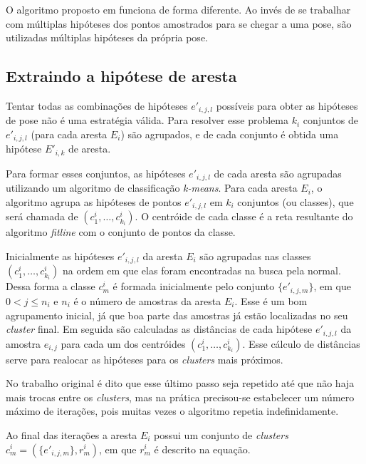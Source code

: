 O algoritmo proposto em \cite{celine} funciona de forma diferente. Ao invés de se trabalhar com múltiplas hipóteses dos pontos amostrados para se chegar a uma pose, são utilizadas múltiplas hipóteses da própria pose.

\subsection{Extraindo a hipótese de aresta}

Tentar todas as combinações de hipóteses $e'_{i,j,l}$ possíveis para obter as hipóteses de pose não é uma estratégia válida. Para resolver esse problema $k_i$ conjuntos de $e'_{i,j,l}$ (para cada aresta $E_i$) são agrupados, e de cada conjunto é obtida uma hipótese $E'_{i,k}$ de aresta.

Para formar esses conjuntos, as hipóteses $e'_{i,j,l}$ de cada aresta são agrupadas utilizando um algoritmo de classificação \emph{k-means}. Para cada aresta $E_i$, o algoritmo agrupa as hipóteses de pontos $e'_{i,j,l}$ em $k_i$ conjuntos (ou classes), que será chamada de $(c^i_1, \dots, c^i_{k_i})$. O centróide de cada classe é a reta resultante do algoritmo \emph{fitline} \cite{fitline_doc} com o conjunto de pontos da classe.

Inicialmente as hipóteses $e'_{i,j,l}$ da aresta $E_i$ são agrupadas nas classes $(c^i_1, \dots, c^i_{k_i})$ na ordem em que elas foram encontradas na busca pela normal. Dessa forma a classe $c^i_m$ é formada inicialmente pelo conjunto $\{e'_{i,j,m}\}$, em que $0 < j \leq n_i$ e $n_i$ é o número de amostras da aresta $E_i$. Esse é um bom agrupamento inicial, já que boa parte das amostras já estão localizadas no seu \emph{cluster} final. Em seguida são calculadas as distâncias de cada hipótese $e'_{i,j,l}$ da amostra $e_{i,j}$ para cada um dos centróides $(c^i_1, \dots, c^i_{k_i})$. Esse cálculo de distâncias serve para realocar as hipóteses para os \emph{clusters} mais próximos.

No trabalho original \cite{celine} é dito que esse último passo seja repetido até que não haja mais trocas entre os \emph{clusters}, mas na prática precisou-se estabelecer um número máximo de iterações, pois muitas vezes o algoritmo repetia indefinidamente.


Ao final das iterações a aresta $E_i$ possui um conjunto de \emph{clusters} $c^i_m = (\{e'_{i,j,m}\}, r^i_m)$, em que $r^i_m$ é descrito na equação.

